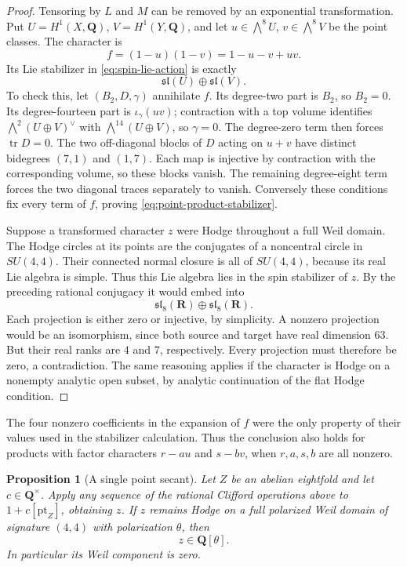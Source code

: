 \documentclass[11pt]{article}
\newtheorem{proposition}[theorem]{Proposition}
\theoremstyle{definition}
\theoremstyle{remark}
\newcommand{\Q}{\mathbf Q}
\newcommand{\R}{\mathbf R}
\begin{document}
\begin{proof}
Tensoring by $L$ and $M$ can be removed by an exponential transformation. Put $U=H^1(X,\Q)$, $V=H^1(Y,\Q)$, and let $u\in\bigwedge^8U$, $v\in\bigwedge^8V$ be the point classes. The character is
\[
 f=(1-u)(1-v)=1-u-v+uv.
\]
Its Lie stabilizer in \eqref{eq:spin-lie-action} is exactly
\begin{equation}\label{eq:point-product-stabilizer}
 \mathfrak{sl}(U)\oplus\mathfrak{sl}(V).
\end{equation}
To check this, let $(B_2,D,\gamma)$ annihilate $f$. Its degree-two part is $B_2$, so $B_2=0$. Its degree-fourteen part is $\iota_\gamma(uv)$; contraction with a top volume identifies $\bigwedge^2(U\oplus V)^\vee$ with $\bigwedge^{14}(U\oplus V)$, so $\gamma=0$. The degree-zero term then forces $\operatorname{tr}D=0$. The two off-diagonal blocks of $D$ acting on $u+v$ have distinct bidegrees $(7,1)$ and $(1,7)$. Each map is injective by contraction with the corresponding volume, so these blocks vanish. The remaining degree-eight term forces the two diagonal traces separately to vanish. Conversely these conditions fix every term of $f$, proving \eqref{eq:point-product-stabilizer}.

Suppose a transformed character $z$ were Hodge throughout a full Weil domain. The Hodge circles at its points are the conjugates of a noncentral circle in $SU(4,4)$. Their connected normal closure is all of $SU(4,4)$, because its real Lie algebra is simple. Thus this Lie algebra lies in the spin stabilizer of $z$. By the preceding rational conjugacy it would embed into
\[
 \mathfrak{sl}_8(\R)\oplus\mathfrak{sl}_8(\R).
\]
Each projection is either zero or injective, by simplicity. A nonzero projection would be an isomorphism, since both source and target have real dimension $63$. But their real ranks are $4$ and $7$, respectively. Every projection must therefore be zero, a contradiction. The same reasoning applies if the character is Hodge on a nonempty analytic open subset, by analytic continuation of the flat Hodge condition.
\end{proof}

The four nonzero coefficients in the expansion of $f$ were the only property of their values used in the stabilizer calculation. Thus the conclusion also holds for products with factor characters $r-au$ and $s-bv$, when $r,a,s,b$ are all nonzero.

\begin{proposition}[A single point secant]\label{prop:single-point-spin}
Let $Z$ be an abelian eightfold and let $c\in\Q^\times$. Apply any sequence of the rational Clifford operations above to $1+c[\mathrm{pt}_Z]$, obtaining $z$. If $z$ remains Hodge on a full polarized Weil domain of signature $(4,4)$ with polarization $\theta$, then
\[
 z\in\Q[\theta].
\]
In particular its Weil component is zero.
\end{proposition}
\end{document}

